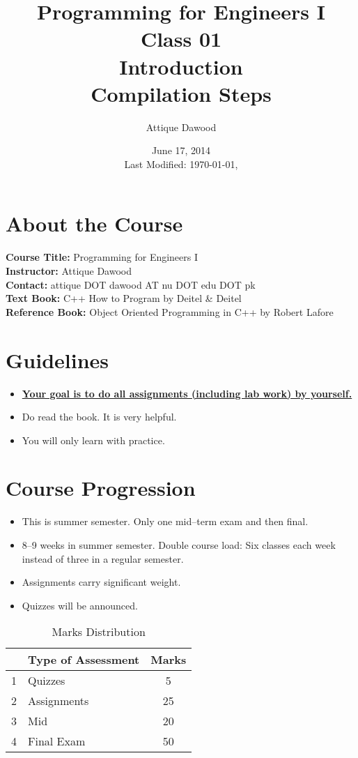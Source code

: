 \documentclass[12pt,a4paper]{article}
\title{Programming for Engineers I\\Class 01\\Introduction\\Compilation Steps}
\author{Attique Dawood}
\date{June 17, 2014\\[0.2cm] Last Modified: \today, \currenttime}
\begin{document}
\maketitle
\section{About the Course}
\textbf{Course Title:} Programming for Engineers I\\
\textbf{Instructor:} Attique Dawood\\
\textbf{Contact:} attique DOT dawood AT nu DOT edu DOT pk\\
\textbf{Text Book:} C++ How to Program by Deitel \& Deitel\\
\textbf{Reference Book:} Object Oriented Programming in C++ by Robert Lafore\\
\section{Guidelines}
\begin{itemize}
\item \textbf{\underline{Your goal is to do all assignments (including lab work) by yourself.}}
\item Do read the book. It is very helpful.
\item You will only learn with practice.
\end{itemize}
\section{Course Progression}
\begin{itemize}
\item This is summer semester. Only one mid--term exam and then final.
\item 8--9 weeks in summer semester. Double course load: Six classes each week instead of three in a regular semester.
\item Assignments carry significant weight.
\item Quizzes will be announced.
\end{itemize}
\begin{table}[H]
\begin{center}
\vspace{0.3cm}
	\begin{tabular}{llc}
	\hline \hline
		\rule{0pt}{2.6ex} & \textbf{Type of Assessment} & \textbf{Marks}\\
		\hline
		1 \rule{0pt}{2.6ex} & Quizzes & 5\\
		2 & Assignments& 25\\
		3 & Mid & 20\\
		4 & Final Exam & 50\\
	\hline \hline
	\end{tabular}
\end{center}
\label{Marks Distribution}
\caption{Marks Distribution}
\end{table}
\end{document}
